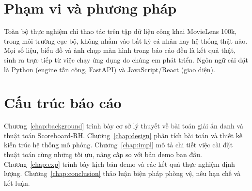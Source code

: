 \section*{Phạm vi và phương pháp}
Toàn bộ thực nghiệm chỉ thao tác trên tập dữ liệu công khai MovieLens 100k, trong môi trường cục bộ, không nhằm vào bất kỳ cá nhân hay hệ thống thật nào. Mọi số liệu, biểu đồ và ảnh chụp màn hình trong báo cáo đều là kết quả thật, sinh ra trực tiếp từ việc chạy ứng dụng do chúng em phát triển. Ngôn ngữ cài đặt là Python (engine tấn công, FastAPI) và JavaScript/React (giao diện).

\section*{Cấu trúc báo cáo}
Chương~\ref{chap:background} trình bày cơ sở lý thuyết về bài toán giải ẩn danh và thuật toán Scoreboard-RH. Chương~\ref{chap:design} phân tích bài toán và thiết kế kiến trúc hệ thống mô phỏng. Chương~\ref{chap:impl} mô tả chi tiết việc cài đặt thuật toán cùng những tối ưu, nâng cấp so với bản demo ban đầu. Chương~\ref{chap:exp} trình bày kịch bản demo và các kết quả thực nghiệm định lượng. Chương~\ref{chap:conclusion} thảo luận biện pháp phòng vệ, nêu hạn chế và kết luận.
